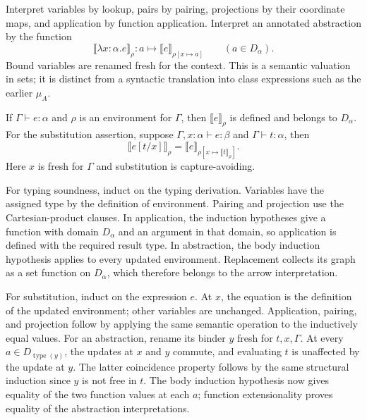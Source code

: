 Interpret variables by lookup, pairs by pairing, projections by their
coordinate maps, and application by function application. Interpret an
annotated abstraction by the function
\[
\llbracket\lambda x:\alpha.e\rrbracket_\rho:
 a\longmapsto\llbracket e\rrbracket_{\rho[x\mapsto a]}
 \qquad(a\in D_\alpha).
\]
Bound variables are renamed fresh for the context. This is a semantic
valuation in sets; it is distinct from a syntactic translation into
class expressions such as the earlier $\mu_A$.

\begin{theorem}
If $\Gamma\vdash e:\alpha$ and $\rho$ is an environment for $\Gamma$,
then $\llbracket e\rrbracket_\rho$ is defined and belongs to $D_\alpha$.
For the substitution assertion, suppose $\Gamma,x:\alpha\vdash e:\beta$ and
$\Gamma\vdash t:\alpha$, then
\[
\llbracket e[t/x]\rrbracket_\rho
=\llbracket e\rrbracket_{\rho[x\mapsto\llbracket t\rrbracket_\rho]}.
\]
Here $x$ is fresh for $\Gamma$ and substitution is capture-avoiding.
\end{theorem}
\Proof
For typing soundness, induct on the typing derivation. Variables have
the assigned type by the definition of environment. Pairing and projection
use the Cartesian-product clauses. In application, the induction
hypotheses give a function with domain $D_\alpha$ and an argument in
that domain, so application is defined with the required result type.
In abstraction, the body induction hypothesis applies to every updated
environment. Replacement collects its graph as a set function on
$D_\alpha$, which therefore belongs to the arrow interpretation.

For substitution, induct on the expression $e$. At $x$, the equation
is the definition of the updated environment; other variables are
unchanged. Application, pairing, and projection follow by applying the
same semantic operation to the inductively equal values. For an
abstraction, rename its binder $y$ fresh for $t,x,\Gamma$. At every
$a\in D_{\operatorname{type}(y)}$, the updates at $x$ and $y$ commute,
and evaluating $t$ is unaffected by the update at $y$. The latter
coincidence property follows by the same structural induction since $y$
is not free in $t$. The body induction hypothesis now gives equality
of the two function values at each $a$; function extensionality proves
equality of the abstraction interpretations.
\Done


